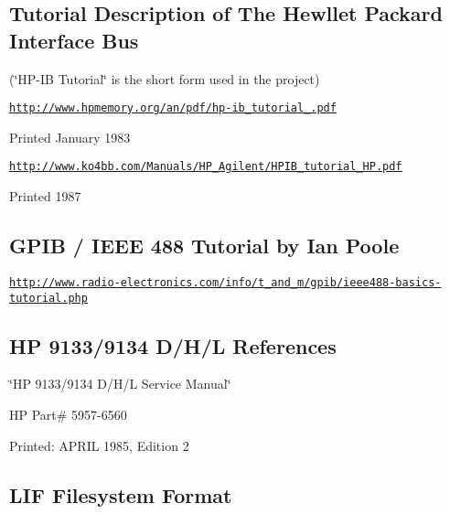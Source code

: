 \subsection*{Tutorial Description of The Hewllet Packard Interface Bus}


\begin{DoxyItemize}
\item (\char`\"{}\-H\-P-\/\-I\-B Tutorial\char`\"{} is the short form used in the project)
\item \href{http://www.hpmemory.org/an/pdf/hp-ib_tutorial_1980.pdf}{\tt http\-://www.\-hpmemory.\-org/an/pdf/hp-\/ib\-\_\-tutorial\-\_.\-pdf}
\item Printed January 1983
\item \href{http://www.ko4bb.com/Manuals/HP_Agilent/HPIB_tutorial_HP.pdf}{\tt http\-://www.\-ko4bb.\-com/\-Manuals/\-H\-P\-\_\-\-Agilent/\-H\-P\-I\-B\-\_\-tutorial\-\_\-\-H\-P.\-pdf}
\item Printed 1987
\end{DoxyItemize}

\subsection*{G\-P\-I\-B / I\-E\-E\-E 488 Tutorial by Ian Poole}


\begin{DoxyItemize}
\item \href{http://www.radio-electronics.com/info/t_and_m/gpib/ieee488-basics-tutorial.php}{\tt http\-://www.\-radio-\/electronics.\-com/info/t\-\_\-and\-\_\-m/gpib/ieee488-\/basics-\/tutorial.\-php}
\end{DoxyItemize}

\subsection*{H\-P 9133/9134 D/\-H/\-L References}


\begin{DoxyItemize}
\item \char`\"{}\-H\-P 9133/9134 D/\-H/\-L Service Manual\char`\"{}
\item H\-P Part\# 5957-\/6560
\item Printed\-: A\-P\-R\-I\-L 1985, Edition 2
\end{DoxyItemize}

\subsection*{L\-I\-F Filesystem Format}


